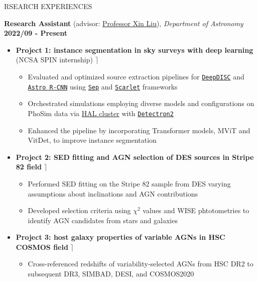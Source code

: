 \documentclass[10pt]{article} %
\begin{document}
\begin{section}{RSEARCH EXPERIENCES}

\textbf{Research Assistant} (advisor: \href{mailto:xinliuxl@illinois.edu}{Professor Xin Liu}), \textit{Department of Astronomy} \hfill \textbf{2022/09 - Present} 
\begin{itemize}[leftmargin=1.5em]
    \item \textbf{Project 1: instance segmentation in sky surveys with deep learning} (NCSA SPIN internship) \hfill $\rceil$ %
    \begin{itemize}[leftmargin=1.5em]
        \item Evaluated and optimized source extraction pipelines for \href{https://github.com/burke86/deepdisc}{\texttt{DeepDISC}} and \href{https://github.com/burke86/astro_rcnn}{\texttt{Astro R-CNN}} using \href{https://github.com/kbarbary/sep/tree/v1.1.x}{\texttt{Sep}} and \href{https://github.com/pmelchior/scarlet}{\texttt{Scarlet}} frameworks
        \item Orchestrated simulations employing diverse models and configurations on PhoSim data via \href{https://www.ncsa.illinois.edu/research/project-highlights/hal-cluster/}{HAL cluster} with \href{https://github.com/facebookresearch/detectron2}{\texttt{Detectron2}}
        \item Enhanced the pipeline by incorporating Transformer models, MViT and VitDet, to improve instance segmentation
    \end{itemize}
    \item \textbf{Project 2: SED fitting and AGN selection of DES sources in Stripe 82 field} \hfill $\rceil$ %
    \begin{itemize}[leftmargin=1.5em]
        \item Performed SED fitting on the Stripe 82 sample from DES varying assumptions about inclinations and AGN contributions
        \item Developed selection criteria using $\chi^2$ values and WISE phtotometries to identify AGN candidates from stars and galaxies
    \end{itemize}
    \item \textbf{Project 3: host galaxy properties of variable AGNs in HSC COSMOS field} \hfill $\rceil$ %
    \begin{itemize}[leftmargin=1.5em]
        \item Cross-referenced redshifts of variability-selected AGNs from HSC DR2 to subsequent DR3, SIMBAD, DESI, and COSMOS2020

\end{itemize}
\end{itemize}
\end{section}
\end{document}
